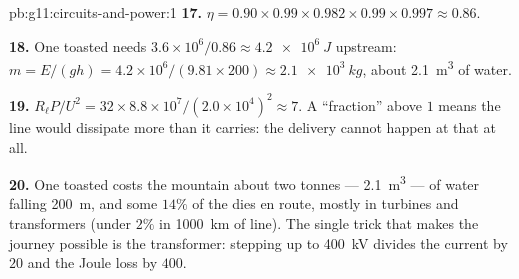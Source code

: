 \begin{solution}{pb:g11:circuits-and-power:1}
\textbf{17.} $\eta = 0.90 \times 0.99 \times 0.982 \times 0.99 \times
0.997 \approx 0.86$.

\textbf{18.} One toasted  needs $3.6\times10^{6}/0.86
\approx \qty{4.2e6}{J}$ upstream: $m = E/(gh) = 4.2\times10^{6}/(9.81
\times 200) \approx \qty{2.1e3}{kg}$, about \qty{2.1}{m^3} of water.

\textbf{19.} $R_\ell P/U^2 = 32 \times 8.8\times10^{7}/(2.0\times
10^{4})^2 \approx 7$. A ``fraction'' above $1$ means the line would
dissipate more than it carries: the delivery cannot happen at that
 at all.

\textbf{20.} One toasted  costs the mountain about two
tonnes --- \qty{2.1}{m^3} --- of water falling \qty{200}{m}, and some
$14\%$ of the  dies en route, mostly in turbines and transformers
(under $2\%$ in \qty{1000}{km} of line). The single trick that makes the
journey possible is the transformer: stepping up to \qty{400}{kV}
divides the current by $20$ and the Joule loss by $400$.
\end{solution}
